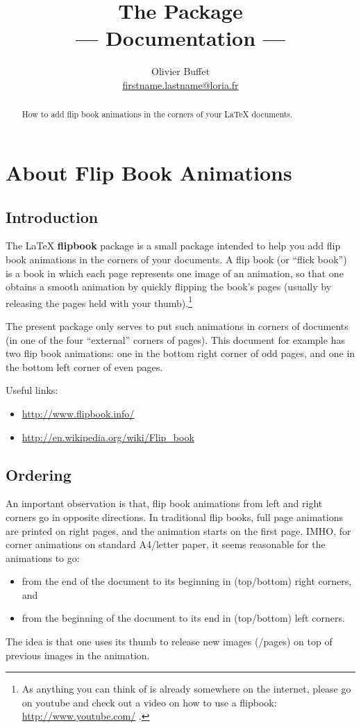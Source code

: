 \documentclass[a4paper,twoside]{article}
\title{The \Flipbook Package\\
  --- Documentation ---}
\author{
  Olivier Buffet\\
  \url{firstname.lastname@loria.fr}
}
\def\flipbook{{\bf flipbook}\xspace}
\begin{document}
\maketitle

\begin{abstract}
  How to add flip book animations in the corners of your \LaTeX{}
  documents.
\end{abstract}

\section{About Flip Book Animations}

\subsection{Introduction}

The \LaTeX{} \flipbook package is a small package intended to help you
add flip book animations in the corners of your documents. A flip book
(or ``flick book'') is a book in which each page represents one image
of an animation, so that one obtains a smooth animation by quickly
flipping the book's pages (usually by releasing the pages held with
your thumb).\footnote{As anything you can think of is already
  somewhere on the internet, please go on youtube and check out a
  video on how to use a flipbook: \url{http://www.youtube.com/} .}

The present package only serves to put such animations in corners of
documents (in one of the four ``external'' corners of pages). This
document for example has two flip book animations: one in the bottom
right corner of odd pages, and one in the bottom left corner of even
pages.

Useful links:
\begin{itemize}
\item \url{http://www.flipbook.info/}
\item \url{http://en.wikipedia.org/wiki/Flip_book}
\end{itemize}

\subsection{Ordering}

An important observation is that, flip book animations from left and
right corners go in opposite directions. In traditional flip books,
full page animations are printed on right pages, and the animation
starts on the first page. IMHO, for corner animations on standard
A4/letter paper, it seems reasonable for the animations to go:
\begin{itemize}
\item from the end of the document to its beginning in (top/bottom)
  right corners, and
\item from the beginning of the document to its end in (top/bottom)
  left corners.
\end{itemize}
The idea is that one uses its thumb to release new images (/pages) on
top of previous images in the animation.
\end{document}
